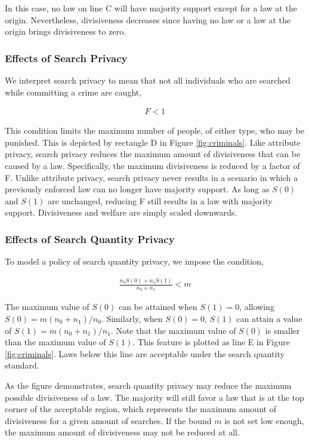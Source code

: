 In this case, no law on line C will have majority support except for a law at the origin.  Nevertheless, divisiveness decreases since having no law or a law at the origin brings divisiveness to zero.


\subsubsection{Effects of Search Privacy}

We interpret search privacy to mean that not all individuals who are searched while committing a crime are caught, 

\begin{align}
F<1
\end{align}

This condition limits the maximum number of people, of either type, who may be punished.  This is depicted by rectangle D in Figure \ref{fig:criminals}.  Like attribute privacy, search privacy reduces the maximum amount of divisiveness that can be caused by a law.  Specifically, the maximum divisiveness is reduced by a factor of F.  Unlike attribute privacy, search privacy never results in a scenario in which a previously enforced law can no longer have majority support.  As long as $S(0)$ and $S(1)$ are unchanged, reducing F still results in a law with majority support.  Divisiveness and welfare are simply scaled downwards.

\subsubsection{Effects of Search Quantity Privacy}

To model a policy of search quantity privacy, we impose the condition, 

\begin{align}
\frac{n_0 S(0) + n_1 S(1)}{n_0 + n_1}  < m
\end{align}

The maximum value of $S(0)$ can be attained when $S(1) = 0$, allowing $S(0) = m (n_0 + n_1)/n_0$.  Similarly, when $S(0) = 0$, $S(1)$ can attain a value of $S(1) = m (n_0 + n_1)/n_1$.   Note that the maximum value of $S(0)$ is smaller than the maximum value of $S(1)$.  This feature is plotted as line E in Figure \ref{fig:criminals}.  Laws below this line are acceptable under the search quantity standard.  

As the figure demonstrates, search quantity privacy may reduce the maximum possible divisiveness of a law.  The majority will still favor a law that is at the top corner of the acceptable region, which represents the maximum amount of divisiveness for a given amount of searches.  If the bound $m$ is not set low enough, the maximum amount of divisiveness may not be reduced at all.

